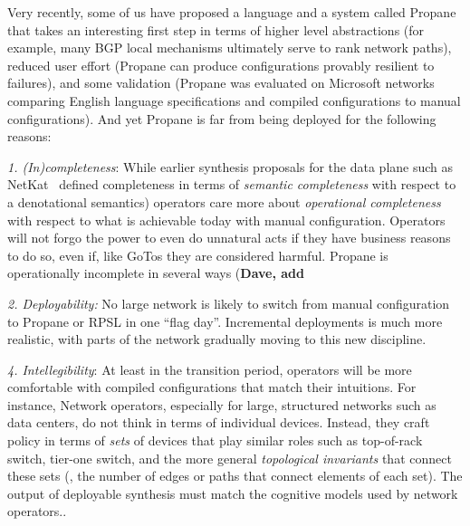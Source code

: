 Very recently, some of us have proposed a language and a system called Propane~\cite{propane} that takes an interesting first step in terms of higher level abstractions (for example, many BGP local mechanisms ultimately serve to rank network paths), reduced user effort (Propane can produce configurations provably resilient to failures), and some validation (Propane was evaluated on Microsoft networks comparing English language specifications and compiled configurations to manual configurations).   And yet Propane is far from being deployed for the following reasons:

{\em 1. (In)completeness}:  While earlier synthesis proposals for the data plane such as NetKat~\cite{netkat} defined completeness in terms of {\em semantic completeness} with respect to a denotational semantics) operators care more about {\em operational completeness} with respect to what is achievable today with manual configuration.   Operators will not forgo the power to even do unnatural acts if they have business reasons to do so, even if, like GoTos they are considered harmful.  Propane is operationally incomplete in several ways ({\bf Dave, add}

{\em 2. Deployability:}   No large network is likely to switch from manual configuration to Propane or RPSL in one “flag day”.   Incremental deployments is much more realistic, with parts of the network gradually moving to this new discipline.

{\em 4.  Intellegibility}:  At least in the transition period, operators will be more comfortable with compiled configurations that match their intuitions.  For instance, Network operators, especially for large, structured networks such as data centers, do not think in terms of individual devices.  Instead, they craft policy in terms of \emph{sets} of devices that
play similar roles such as top-of-rack switch, tier-one switch, \etc and the more general \emph{topological invariants} that connect these sets (\eg, the number of edges or paths that connect elements of each set).  The output of deployable synthesis must match the cognitive models used by network operators..



